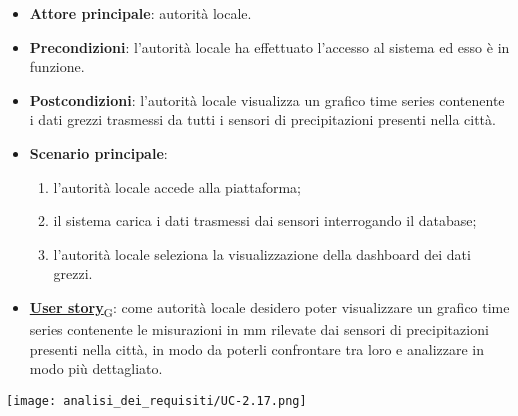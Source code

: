 \begin{itemize}
	\item \textbf{Attore principale}: autorità locale.
	\item \textbf{Precondizioni}: l'autorità locale ha effettuato l'accesso al sistema ed esso è in funzione.
	\item \textbf{Postcondizioni}: l'autorità locale visualizza un grafico time series contenente i dati grezzi trasmessi da tutti i sensori
	      di precipitazioni presenti nella città.
	\item \textbf{Scenario principale}:
	      \begin{enumerate}
		      \item l'autorità locale accede alla piattaforma;
		      \item il sistema carica i dati trasmessi dai sensori interrogando il database;
		      \item l'autorità locale seleziona la visualizzazione della dashboard dei dati grezzi.
	      \end{enumerate}
	\item \href{https://7last.github.io/docs/pb/documentazione-interna/glossario\#user-story}{\textbf{User story}\textsubscript{G}}:
	      come autorità locale desidero poter visualizzare un grafico time series contenente le misurazioni in mm rilevate dai sensori
	      di precipitazioni presenti nella città, in modo da poterli confrontare tra loro e analizzare in modo più dettagliato.
\end{itemize}
\begin{center}
	\texttt{[image: analisi\_dei\_requisiti/UC-2.17.png]}
\end{center}


